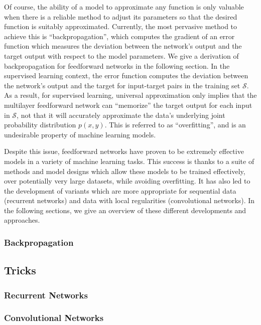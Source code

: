 Of course, the ability of a model to approximate any function is only valuable when there is a reliable method to adjust its parameters so that the desired function is suitably approximated.
Currently, the most pervasive method to achieve this is ``backpropagation'', which computes the gradient of an error function which measures the deviation between the network's output and the target output with respect to the model parameters.
We give a derivation of backpropagation for feedforward networks in the following section.
In the supervised learning context, the error function computes the deviation between the network's output and the target for input-target pairs in the training set $\mathcal{S}$.
As a result, for supervised learning, universal approximation only implies that the multilayer feedforward network can ``memorize'' the target output for each input in $\mathcal{S}$, not that it will accurately approximate the data's underlying joint probability distribution $p(x, y)$.
This is referred to as ``overfitting'', and is an undesirable property of machine learning models.

Despite this issue, feedforward networks have proven to be extremely effective models in a variety of machine learning tasks.
This success is thanks to a suite of methods and model designs which allow these models to be trained effectively, over potentially very large datasets, while avoiding overfitting.
It has also led to the development of variants which are more appropriate for sequential data (recurrent networks) and data with local regularities (convolutional networks).
In the following sections, we give an overview of these different developments and approaches.

\subsubsection{Backpropagation}

\subsection{Tricks}

\subsubsection{Recurrent Networks}

\subsubsection{Convolutional Networks}

